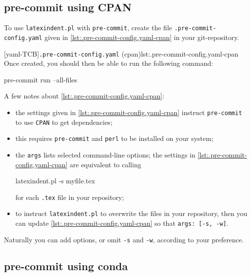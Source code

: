 \documentclass[10pt]{article}
\begin{document}
 \subsection{pre-commit using CPAN}\label{sec:pre-commit-cpan}

  To use \texttt{latexindent.pl} with \texttt{pre-commit}, create the file
  \texttt{.pre-commit-config.yaml} given in \cref{lst:.pre-commit-config.yaml-cpan} in
  your git-repository.   

  [yaml-TCB]{\texttt{.pre-commit-config.yaml} (cpan)}{lst:.pre-commit-config.yaml-cpan}
  Once created, you should then be able to run the following command:

  \begin{commandshell}
pre-commit run --all-files
\end{commandshell}

  A few notes about \cref{lst:.pre-commit-config.yaml-cpan}:
  \begin{itemize}
   \item the settings given in \cref{lst:.pre-commit-config.yaml-cpan} instruct
         \texttt{pre-commit} to use \texttt{CPAN} to get dependencies;
   \item this requires \texttt{pre-commit} and \texttt{perl} to be installed on your
         system;
   \item the \texttt{args} lists selected command-line options; the settings in
         \cref{lst:.pre-commit-config.yaml-cpan} are equivalent to calling

         \begin{commandshell}
latexindent.pl -s myfile.tex
\end{commandshell}

         for each \texttt{.tex} file in your repository;
   \item to instruct \texttt{latexindent.pl} to overwrite the files in your repository,
         then you can update \cref{lst:.pre-commit-config.yaml-cpan} so that
         \texttt{args: [-s, -w]}.
  \end{itemize}

  Naturally you can add options, or omit \texttt{-s} and \texttt{-w}, according to your
  preference.

 \subsection{pre-commit using conda}\label{sec:pre-commit-conda}
\end{document}
